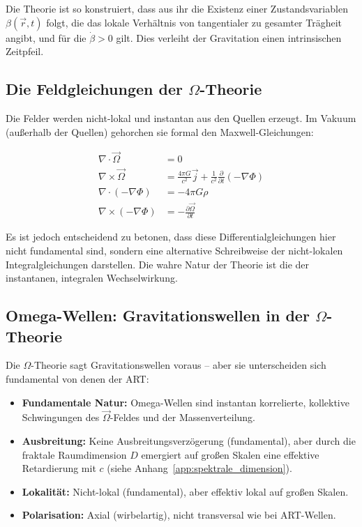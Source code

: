 Die Theorie ist so konstruiert, dass aus ihr die Existenz einer Zustandsvariablen \( \beta(\vec{r}, t) \) folgt, die das lokale Verhältnis von tangentialer zu gesamter Trägheit angibt, und für die \( \dot{\beta} > 0 \) gilt. Dies verleiht der Gravitation einen intrinsischen Zeitpfeil.

\subsection{Die Feldgleichungen der \( \Omega \)-Theorie}
\label{sub:omega_feldgleichungen}

Die Felder werden nicht-lokal und instantan aus den Quellen erzeugt. Im Vakuum (außerhalb der Quellen) gehorchen sie formal den Maxwell-Gleichungen:

\[
\begin{aligned}
\nabla \cdot \vec{\Omega} &= 0 \\
\nabla \times \vec{\Omega} &= \frac{4\pi G}{c^2} \vec{j} + \frac{1}{c^2} \frac{\partial}{\partial t} (-\nabla \Phi) \\
\nabla \cdot (-\nabla \Phi) &= -4\pi G\rho \\
\nabla \times (-\nabla \Phi) &= -\frac{\partial \vec{\Omega}}{\partial t}
\end{aligned}
\]

Es ist jedoch entscheidend zu betonen, dass diese Differentialgleichungen hier nicht fundamental sind, sondern eine alternative Schreibweise der nicht-lokalen Integralgleichungen darstellen. Die wahre Natur der Theorie ist die der instantanen, integralen Wechselwirkung.

\subsection{Omega-Wellen: Gravitationswellen in der \( \Omega \)-Theorie}
\label{sub:omega_wellen}

Die \( \Omega \)-Theorie sagt Gravitationswellen voraus – aber sie unterscheiden sich fundamental von denen der ART:

\begin{itemize}
    \item \textbf{Fundamentale Natur:} Omega-Wellen sind instantan korrelierte, kollektive Schwingungen des \( \vec{\Omega} \)-Feldes und der Massenverteilung.
    \item \textbf{Ausbreitung:} Keine Ausbreitungsverzögerung (fundamental), aber durch die fraktale Raumdimension \( D \) emergiert auf großen Skalen eine effektive Retardierung mit \( c \) (siehe Anhang~\ref{app:spektrale_dimension}).
    \item \textbf{Lokalität:} Nicht-lokal (fundamental), aber effektiv lokal auf großen Skalen.
    \item \textbf{Polarisation:} Axial (wirbelartig), nicht transversal wie bei ART-Wellen.
\end{itemize}

